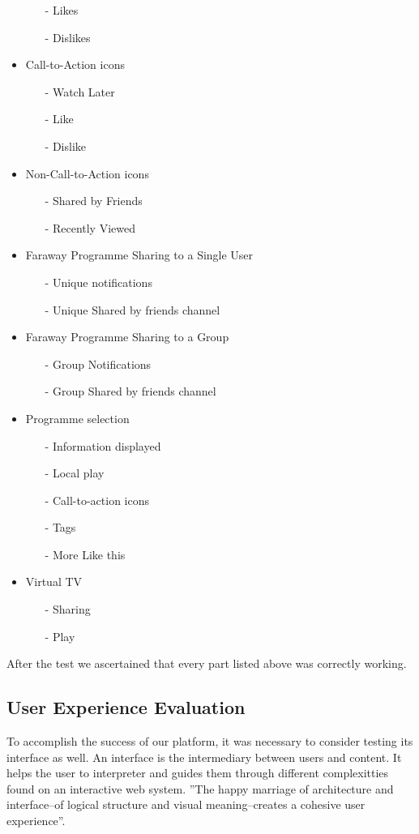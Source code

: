 \documentclass{acm_proc_article-sp}
\begin{document}
\begin{itemize}
\begin{itemize}
  	\item [-]Likes
  	\item [-]Dislikes
  \end{itemize}
  \item Call-to-Action icons
  \begin{itemize}
  	\item [-]Watch Later
  	\item [-]Like
  	\item [-]Dislike
  \end{itemize}
  \item Non-Call-to-Action icons
  \begin{itemize}
  	\item [-]Shared by Friends
  	\item [-]Recently Viewed
  \end{itemize}
  \item Faraway Programme Sharing to a Single User
  \begin{itemize}
  	\item [-]Unique notifications
  	\item [-]Unique Shared by friends channel
  \end{itemize}
  \item Faraway Programme Sharing to a Group
  \begin{itemize}
  	\item [-]Group Notifications
  	\item [-]Group Shared by friends channel
  \end{itemize}
  \item Programme selection
  \begin{itemize}
  	\item [-]Information displayed
  	\item [-]Local play
  	\item [-]Call-to-action icons
  	\item [-]Tags
  	\item [-]More Like this
  \end{itemize}
  \item Virtual TV
  \begin{itemize}
  	\item [-]Sharing
  	\item [-]Play
  \end{itemize}
\end{itemize}

After the test we ascertained that every part listed above was correctly working. 
\subsection{User Experience Evaluation}
To accomplish the success of our platform, it was necessary to consider testing its interface as 
well. An interface is the intermediary between users and content. It helps the user to interpreter and guides them through different complexitties found on an interactive web system. ''The happy marriage of architecture and interface--of logical 
structure and visual meaning--creates a cohesive user experience''\cite{fleming1998web}. 
\end{document}

